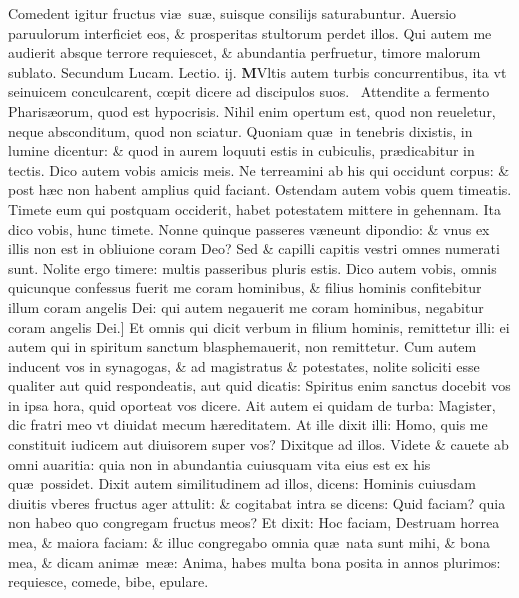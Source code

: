 \documentclass[a5paper,10pt]{book}
\def\leftmarginnote{%
	\lrmarginnote{\hskip -\marginparsep \hskip -6.5em}}
\def\rightmarginnote{%
	\lrmarginnote{\hskip\columnwidth \hskip -1em}}
\def\ae{æ}
\def\oe{œ}
\begin{document}
\begin{multicols*}{2}
Comedent igitur fructus vi\ae \ su\ae , suisque consilijs saturabuntur.
Auersio paruulorum interficiet eos, \& prosperitas stultorum perdet illos.
Qui autem me audierit absque terrore requiescet, \& abundantia perfruetur, timore malorum sublato.
\fancyhead[C]{\color{red} Feria. ij. Dominic\ae . j. post aduentum}
\newline \color{red} Secundum Lucam. \hfill Lectio. ij. \color{black}
\vspace{-.25em}
\lettrine[lines=2]{\bfseries \color{red} M}{}Vltis\rightmarginnote{c. 12.} autem turbis concurrentibus, ita vt seinuicem conculcarent, c\oe pit dicere ad discipulos suos. \textdagger \ Attendite\rightmarginnote{A} a fermento Pharis\ae orum, quod est hypocrisis.
Nihil enim opertum est, quod non reueletur, neque absconditum, quod non sciatur.
Quoniam qu\ae \ in tenebris dixistis, in lumine dicentur: \& quod in aurem loquuti estis in cubiculis, pr\ae dicabitur in tectis.
Dico autem vobis amicis meis. Ne terreamini ab his qui occidunt corpus: \& post h\ae c non habent amplius quid faciant.
Ostendam autem vobis quem timeatis. Timete eum qui postquam occiderit, habet potestatem mittere in gehennam. Ita dico vobis, hunc timete.
Nonne quinque passeres v\ae neunt dipondio: \& vnus ex illis non est in obliuione coram Deo?
Sed \& capilli capitis vestri omnes numerati sunt. Nolite ergo timere: multis passeribus pluris estis.
Dico autem vobis, omnis quicunque confessus fuerit me coram hominibus, \& filius hominis confitebitur illum coram angelis Dei: qui autem negauerit me coram hominibus, negabitur coram angelis\leftmarginnote{\begin{flushright}B\end{flushright}} Dei.]
Et omnis qui dicit verbum in filium hominis, remittetur illi: ei autem qui in spiritum sanctum blasphemauerit, non remittetur.
Cum autem inducent vos in synagogas, \& ad magistratus \& potestates, nolite soliciti esse qualiter aut quid respondeatis, aut quid dicatis: Spiritus enim sanctus docebit vos in ipsa hora, quid oporteat vos dicere.
Ait autem ei quidam de turba: Magister, dic fratri meo vt diuidat mecum h\ae reditatem.
At ille dixit illi: Homo, quis me constituit iudicem aut diuisorem super vos?
Dixitque ad illos. Videte \& cauete ab omni auaritia: quia non in abundantia cuiusquam vita eius est ex his qu\ae \ possidet.
Dixit autem similitudinem ad illos, dicens: Hominis cuiusdam diuitis vberes fructus ager attulit: \& cogitabat intra se dicens: Quid faciam? quia non habeo quo congregam fructus meos?
Et dixit: Hoc faciam, Destruam horrea mea, \& maiora faciam: \& illuc congregabo omnia qu\ae \ nata sunt mihi, \& bona mea, \& dicam anim\ae \ me\ae : Anima, habes multa bona posita in annos plurimos: requiesce, comede, bibe, epulare.

\end{multicols*}
\end{document}
